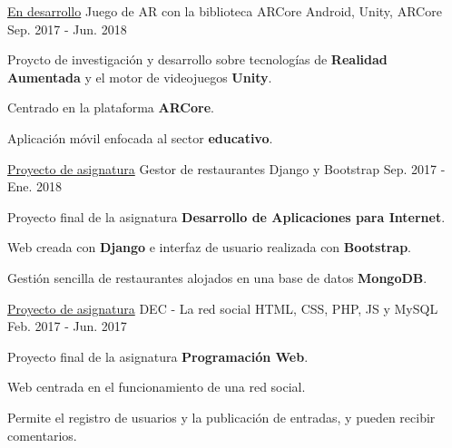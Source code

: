 

\begin{cventries}

  \cventry
    {\href{https://github.com/matl1995/TFG}{En desarrollo}} %
    {Juego de AR con la biblioteca ARCore} %
    {Android, Unity, ARCore} %
    {Sep. 2017 - Jun. 2018} %
    {
      \begin{cvitems} %
        \item {Proycto de investigación y desarrollo sobre tecnologías de \textbf{Realidad Aumentada} y el motor de videojuegos \textbf{Unity}.}
        \item {Centrado en la plataforma \textbf{ARCore}.}
        \item {Aplicación móvil enfocada al sector \textbf{educativo}.}
      \end{cvitems}
    }

  \cventry
    {\href{https://github.com/matl1995/DAI}{Proyecto de asignatura}} %
    {Gestor de restaurantes} %
    {Django y Bootstrap} %
    {Sep. 2017 - Ene. 2018} %
    {
      \begin{cvitems} %
        \item {Proyecto final de la asignatura \textbf{Desarrollo de Aplicaciones para Internet}.}
        \item {Web creada con \textbf{Django} e interfaz de usuario realizada con \textbf{Bootstrap}.}
        \item {Gestión sencilla de restaurantes alojados en una base de datos \textbf{MongoDB}.}
      \end{cvitems}
    }

  \cventry
    {\href{https://github.com/matl1995/PW}{Proyecto de asignatura}} %
    {DEC - La red social} %
    {HTML, CSS, PHP, JS y MySQL} %
    {Feb. 2017 - Jun. 2017} %
    {
      \begin{cvitems} %
        \item {Proyecto final de la asignatura \textbf{Programación Web}.}
        \item {Web centrada en el funcionamiento de una red social.}
        \item {Permite el registro de usuarios y la publicación de entradas, y pueden recibir comentarios.}
      \end{cvitems}
    }


\end{cventries}

